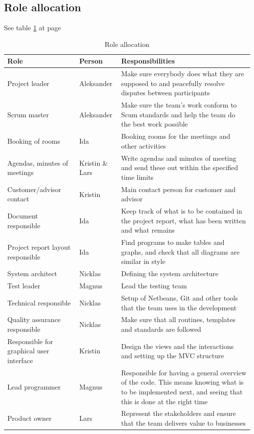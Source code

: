 \subsection{Role allocation}
See table \ref{tab:roleallocation} at page \pageref{tab:roleallocation}
\begin{table}
\begin{tabularx}{\linewidth}{>{\setlength\hsize{.5\hsize}}X|>{\setlength\hsize{0.3\hsize}}X|>{\setlength\hsize{1\hsize}}X} \hline
\textbf{Role} & \textbf{Person} & \textbf{Responsibilities} \\ \hline \hline
Project leader & Aleksander & Make sure everybody does what they are supposed to and peacefully resolve disputes between participants \\
Scrum master & Aleksander & Make sure the team’s work conform to Scum standards and help the team do the best work possible \\
Booking of rooms & Ida & Booking rooms for the meetings and other activities \\
Agendas, minutes of meetings & Kristin \& Lars &Write agendas and minutes of meeting and send these out within the specified time limits \\
Customer/advisor contact & Kristin & Main contact person for customer and advisor \\
Document responsible & Ida &Keep track of what is to be contained in the project report, what has been written and what remains \\
Project report layout responsible & Ida &Find programs to make tables and graphs, and check that all diagrams are similar in style \\
System architect & Nicklas & Defining the system architecture \\
Test leader & Magnus & Lead the testing team \\
Technical responsible & Nicklas & Setup of Netbeans, Git and other tools that the team uses in the development \\
Quality assurance responsible & Nicklas & Make sure that all routines, templates and standards are followed \\
Responsible for graphical user interface & Kristin & Design the views and the interactions and setting up the MVC structure \\
Lead programmer & Magnus & Responsible for having a general overview of the code. This means knowing what is to be implemented next, and seeing that this is done at the right time \\
Product owner & Lars & Represent the stakeholders and ensure that the team delivers value to businesses\\ \hline
\end{tabularx}
\caption {Role allocation} \label{tab:roleallocation}
\end{table}

